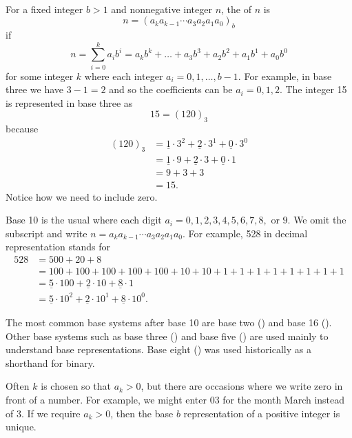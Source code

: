 \begin{defn}
\label{defn_base_b}
~
    \begin{apart}
        \item For a fixed integer $b > 1$ and nonnegative integer $n$, the  of $n$ is 
            $$n=\left(a_ka_{k-1}\cdots a_3a_2a_1a_0\right)_b$$
        if 
            $$n=\sum_{i=0}^ka_ib^i = a_kb^k + \dots + a_3b^ 3+a_2b^2+a_1b^1+a_0b^0$$ 
        for some integer $k$ where each integer $a_i = 0,1, \ldots, b-1$. For example, in base three we have $3-1=2$ and so the coefficients can be $a_i=0,1,2$. The integer 15 is represented in base three as $$15=(120)_3$$ because 
            \begin{align*}
                (120)_3 & = \underline{1} \cdot 3^2 + \underline{2}\cdot 3^1 + \underline{0} \cdot 3^0 \\
                & = \underline{1} \cdot 9 + \underline{2}\cdot 3 + \underline{0} \cdot 1 \\
                & = 9 + 3 + 3\\
                & = 15.
            \end{align*}
            Notice how we need to include zero.
        \item Base 10 is the usual  where each digit $a_i = 0, 1, 2, 3, 4, 5, 6, 7, 8,$ or $9$.  We omit the subscript and write $n = a_ka_{k-1}\cdots a_3a_2a_1a_0$. For example, 528 in decimal representation stands for 
            \begin{align*}
                528 & = 500+20+8 \\
                & = 100+100+100+100+100+10+10+1+1+1+1+1+1+1+1 \\
                & = \underline{5} \cdot 100 + \underline{2} \cdot 10 + \underline{8} \cdot 1 \\
                & = \underline{5} \cdot 10^2 + \underline{2} \cdot 10^1 + \underline{8} \cdot 10^0.
            \end{align*}
        \item The most common base systems after base 10 are base two () and base 16 ().  
        Other base systems such as base three () and base five () are used mainly to understand base representations.  Base eight () was used historically as a shorthand for binary.
        \item Often $k$ is chosen so that  $a_k > 0$, but there are occasions where we write zero in front of a number. For example, we might enter 03 for the month March instead of 3. If we require $a_k > 0$, then the base $b$ representation of a positive integer is unique.
    \end{apart}
\end{defn}

